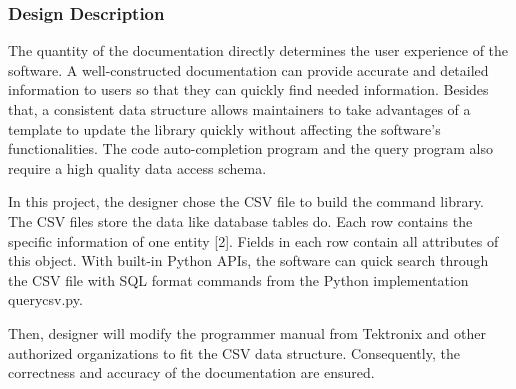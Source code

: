 \documentclass [10pt]{article}
\begin{document}
\subsubsection{Design Description}
The quantity of the documentation directly determines the user experience of the software. A well-constructed documentation can provide accurate and detailed information to users so that they can quickly find needed information. Besides that, a consistent data structure allows maintainers to take advantages of a template to update the library quickly without affecting the software's functionalities. The code auto-completion program and the query program also require a high quality data access schema. \par  
In this project, the designer chose the CSV file to build the command library. The CSV files store the data like database tables do. Each row contains the specific information of one entity [2]. Fields in each row contain all attributes of this object. With built-in Python APIs, the software can quick search through the CSV file with SQL format commands from the Python implementation querycsv.py.\par
Then, designer will modify the programmer manual from Tektronix and other authorized organizations to fit the CSV data structure. Consequently, the correctness and accuracy of the documentation are ensured.   
\end{document}
